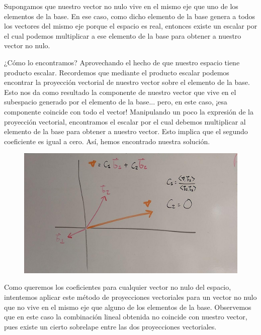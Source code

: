 \documentclass[12pt,dvipsnames]{article}
\numberwithin{equation}{section}
\begin{document}
Supongamos que nuestro vector no nulo vive en el mismo eje que uno de los elementos de la base. En ese caso, como dicho elemento de la base genera a todos los vectores del mismo eje porque el espacio es real, entonces existe un escalar por el cual podemos multiplicar a ese elemento de la base para obtener a nuestro vector no nulo.

¿Cómo lo encontramos? Aprovechando el hecho de que nuestro espacio tiene producto escalar. Recordemos que mediante el producto escalar podemos encontrar la proyección vectorial de nuestro vector sobre el elemento de la base. Esto nos da como resultado la componente de nuestro vector que vive en el subespacio generado por el elemento de la base... pero, en este caso, ¡esa componente coincide con todo el vector! Manipulando un poco la expresión de la proyección vectorial, encontramos el escalar por el cual debemos multiplicar al elemento de la base para obtener a nuestro vector. Esto implica que el segundo coeficiente es igual a cero. Así, hemos encontrado nuestra solución.

\begin{figure}[h!]
    \centering
    \includegraphics[width=\textwidth]{3/Bases_ortogonales_y_ortonormales_3-1.jpg}
\end{figure}

\newpage
Como queremos los coeficientes para cualquier vector no nulo del espacio, intentemos aplicar este método de proyecciones vectoriales para un vector no nulo que no vive en el mismo eje que alguno de los elementos de la base. Observemos que en este caso la combinación lineal obtenida no coincide con nuestro vector, pues existe un cierto sobrelape entre las dos proyecciones vectoriales.
\end{document}
